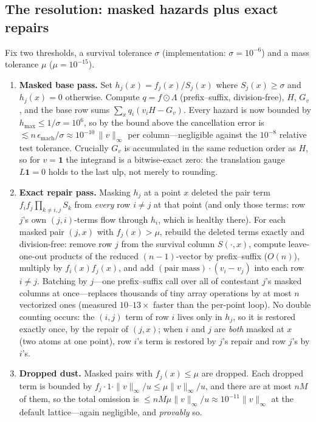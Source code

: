 \documentclass[11pt]{article}
\theoremstyle{definition}
\theoremstyle{remark}
\newcommand{\one}{\mathbf{1}}
\begin{document}
\subsection{The resolution: masked hazards plus exact repairs}

Fix two thresholds, a survival tolerance $\sigma$ (implementation:
$\sigma = 10^{-6}$) and a mass tolerance $\mu$ ($\mu = 10^{-15}$).

\begin{enumerate}
  \item \textbf{Masked base pass.}  Set $h_j(x) = f_j(x)/S_j(x)$ where
    $S_j(x) \ge \sigma$ and $h_j(x) = 0$ otherwise.  Compute
    $q = f \odot \Lambda$ (prefix--suffix, division-free), $H$, $G_v$, and
    the base row sums $\sum_x q_i (v_i H - G_v)$.  Every hazard is now
    bounded by $h_{\max} \le 1/\sigma = 10^{6}$, so by the bound above the
    cancellation error is
    $\lesssim n\,\epsilon_{\mathrm{mach}}/\sigma \approx 10^{-10}\,
    \|v\|_\infty$ per column---negligible against the $10^{-8}$ relative
    test tolerance.  Crucially $G_v$ is accumulated in the same reduction
    order as $H$, so for $v = \one$ the integrand is a bitwise-exact zero:
    the translation gauge $L\one = 0$ holds to the last ulp, not merely to
    rounding.
  \item \textbf{Exact repair pass.}  Masking $h_j$ at a point $x$ deleted
    the pair term $f_i f_j \prod_{k\ne i,j} S_k$ from \emph{every} row
    $i \ne j$ at that point (and only those terms: row $j$'s own
    $(j,i)$-terms flow through $h_i$, which is healthy there).  For each
    masked pair $(j, x)$ with $f_j(x) > \mu$, rebuild the deleted terms
    exactly and division-free: remove row $j$ from the survival column
    $S(\cdot, x)$, compute leave-one-out products of the reduced
    $(n-1)$-vector by prefix--suffix ($O(n)$), multiply by
    $f_i(x)f_j(x)$, and add $(\text{pair mass})\cdot(v_i - v_j)$ into each
    row $i \ne j$.  Batching by $j$---one prefix--suffix call over all of
    contestant $j$'s masked columns at once---replaces thousands of tiny
    array operations by at most $n$ vectorized ones (measured
    $10$--$13\times$ faster than the per-point loop).  No double counting
    occurs: the $(i,j)$ term of row $i$ lives only in $h_j$, so it is
    restored exactly once, by the repair of $(j, x)$; when $i$ and $j$ are
    \emph{both} masked at $x$ (two atoms at one point), row $i$'s term is
    restored by $j$'s repair and row $j$'s by $i$'s.
  \item \textbf{Dropped dust.}  Masked pairs with $f_j(x) \le \mu$ are
    dropped.  Each dropped term is bounded by
    $f_j \cdot 1 \cdot \|v\|_\infty / u \le \mu \|v\|_\infty / u$, and there
    are at most $nM$ of them, so the total omission is
    $\le n M \mu \|v\|_\infty / u \approx 10^{-11}\|v\|_\infty$ at the
    default lattice---again negligible, and \emph{provably} so.
\end{enumerate}
\end{document}
